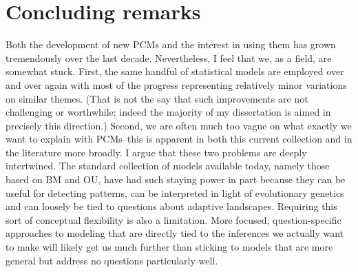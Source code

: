 \section{Concluding remarks}

Both the development of new PCMs and the interest in using them has grown tremendously over the last decade.  Nevertheless, I feel that we, as a field, are somewhat stuck. First, the same handful of statistical models are employed over and over again with most of the progress representing relatively minor variations on similar themes. (That is not the say that such improvements are not challenging or worthwhile; indeed the majority of my dissertation is aimed in precisely this direction.) Second, we are often much too vague on what exactly we want to explain with PCMs--this is apparent in both this current collection and in the literature more broadly. I argue that these two problems are deeply intertwined. The standard collection of models available today, namely those based on BM and OU, have had such staying power in part because they can be useful for detecting patterns, can be interpreted in light of evolutionary genetics and can loosely be tied to questions about adaptive landscapes. Requiring this sort of conceptual flexibility is also a limitation. More focused, question-specific approaches to modeling that are directly tied to the inferences we actually want to make will likely get us much further than sticking to models that are more general but address no questions particularly well.

 

   

